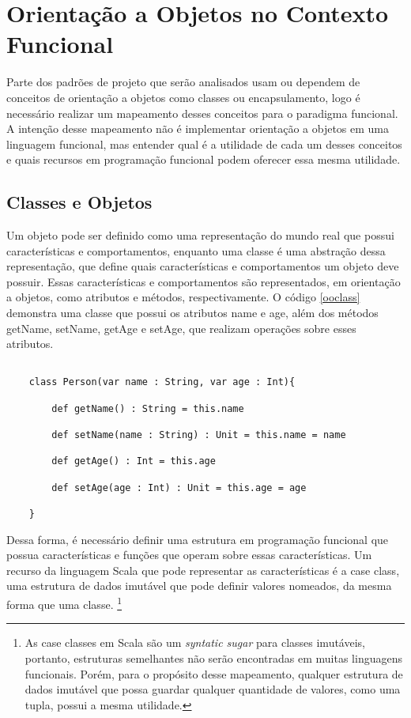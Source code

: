 
\chapter{Orientação a Objetos no Contexto Funcional}


Parte dos padrões de projeto que serão 
analisados usam ou dependem de conceitos 
de orientação a objetos como classes ou 
encapsulamento, logo é necessário 
realizar um mapeamento desses conceitos 
para o paradigma funcional. A intenção 
desse mapeamento não é implementar 
orientação a objetos em uma linguagem 
funcional, mas entender qual é a utilidade 
de cada um desses conceitos e quais 
recursos em programação funcional podem 
oferecer essa mesma utilidade.


\section{Classes e Objetos}

Um objeto pode ser definido como uma representação 
do mundo real que possui características e comportamentos, 
enquanto uma classe é uma abstração dessa representação, 
que define quais características e comportamentos um objeto 
deve possuir\cite{umlsystems}. Essas características 
e comportamentos são representados, em orientação a 
objetos, como atributos e métodos, respectivamente. 
O código \ref{ooclass} demonstra uma classe que 
possui os atributos name e age, além dos métodos 
getName, setName, getAge e setAge, que realizam 
operações sobre esses atributos.

\begin{lstlisting}[caption={Classe comum em Orientação a Objetos},label=ooclass]
    
    class Person(var name : String, var age : Int){

        def getName() : String = this.name

        def setName(name : String) : Unit = this.name = name

        def getAge() : Int = this.age

        def setAge(age : Int) : Unit = this.age = age

    }   

\end{lstlisting}

Dessa forma, é necessário definir uma estrutura em 
programação funcional que possua características e 
funções que operam sobre essas características. 
Um recurso da linguagem Scala que pode representar 
as características é a case class, uma estrutura de 
dados imutável que pode definir valores nomeados, 
da mesma forma que uma classe\cite{functionalscala}. 
\footnote{As case classes em Scala são um \textit{syntatic 
sugar} para classes imutáveis, portanto, estruturas 
semelhantes não serão encontradas em muitas linguagens 
funcionais. Porém, para o propósito desse mapeamento, 
qualquer estrutura de dados imutável que possa guardar 
qualquer quantidade de valores, como uma tupla, possui a 
mesma utilidade.}

